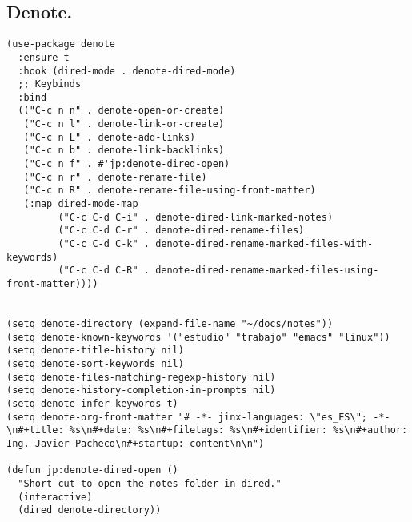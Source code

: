 \documentclass[11pt]{article}
\begin{document}
\subsection{Denote.}
\label{sec:orgf7bfa06}
\begin{verbatim}
(use-package denote
  :ensure t
  :hook (dired-mode . denote-dired-mode)
  ;; Keybinds
  :bind
  (("C-c n n" . denote-open-or-create)
   ("C-c n l" . denote-link-or-create)
   ("C-c n L" . denote-add-links)
   ("C-c n b" . denote-link-backlinks)
   ("C-c n f" . #'jp:denote-dired-open)
   ("C-c n r" . denote-rename-file)
   ("C-c n R" . denote-rename-file-using-front-matter)
   (:map dired-mode-map
         ("C-c C-d C-i" . denote-dired-link-marked-notes)
         ("C-c C-d C-r" . denote-dired-rename-files)
         ("C-c C-d C-k" . denote-dired-rename-marked-files-with-keywords)
         ("C-c C-d C-R" . denote-dired-rename-marked-files-using-front-matter))))


(setq denote-directory (expand-file-name "~/docs/notes"))
(setq denote-known-keywords '("estudio" "trabajo" "emacs" "linux"))
(setq denote-title-history nil)
(setq denote-sort-keywords nil)
(setq denote-files-matching-regexp-history nil)
(setq denote-history-completion-in-prompts nil)
(setq denote-infer-keywords t)
(setq denote-org-front-matter "# -*- jinx-languages: \"es_ES\"; -*-\n#+title: %s\n#+date: %s\n#+filetags: %s\n#+identifier: %s\n#+author: Ing. Javier Pacheco\n#+startup: content\n\n")

(defun jp:denote-dired-open ()
  "Short cut to open the notes folder in dired."
  (interactive)
  (dired denote-directory))


\end{verbatim}
\end{document}

